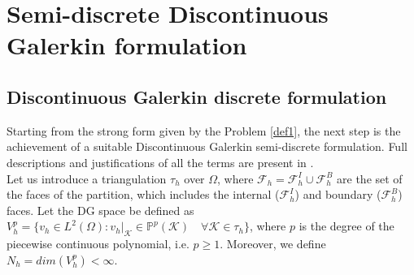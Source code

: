 \documentclass[a4paper,11pt]{article}
\begin{document}
   
\newpage

    \section{Semi-discrete Discontinuous Galerkin formulation}
    \subsection{Discontinuous Galerkin discrete formulation}
    Starting from the strong form given by the Problem \ref{def1}, the next step is the achievement of a suitable Discontinuous Galerkin semi-discrete formulation. Full descriptions and justifications of all the terms are present in \cite{marta} . \\
    Let us introduce a triangulation $\tau_h$ over $\Omega$, where $\mathcal{F} _h=\mathcal{F} _h^I \cup \mathcal{F} _h^B$ are the set of the faces of the partition, which includes the internal ($\mathcal{F} _h^I$) and boundary ($\mathcal{F} _h^B$) faces. Let the DG space be defined as $V_h^p = \{v_h \in L^2(\Omega) : v_h|_\mathcal{K} \in \mathbb{P}^{p}(\mathcal{K})  \quad \forall \mathcal{K} \in \tau_h \}$, where $p$ is the degree of the piecewise continuous polynomial, i.e. $p \geq 1$. Moreover, we define $N_h=dim(V_h^p)<\infty$. \vspace{4mm}
\end{document}
